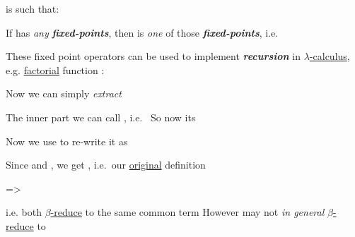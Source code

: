   is such that:
\begin{enumerate}
    \vItem If  has \textit{any} \textbf{\textit{fixed-points}},
    then  is \textit{one} of those
    \textbf{\textit{fixed-points}},
    i.e. 

    \vItem These fixed point operators can be used to implement
    \textbf{\textit{recursion}} in \ul{$\lambda$-calculus},
    e.g. \ul{factorial} function :
    \begin{enumerate}
        \vItem
        \vItem
        Now we can simply \textit{extract}

        \begin{itemize}

            \vItem
            The inner part we can call ,
            i.e.~
            \vItem
            So now its
        \end{itemize}
        \vItem
        Now we use  to re-write it as

        \begin{itemize}

            \vItem
            Since
            and , we get
            , i.e.~our
            \ul{original} definition
        \end{itemize}
    \end{enumerate}
\end{enumerate}


\hSep

 => 
\begin{enumerate}
    \vItem {} i.e. 
    both \ul{$\beta$-reduce} to the same common term
    \vItem However  may not \textit{in general}
    \ul{$\beta$-reduce} to 
\end{enumerate}

